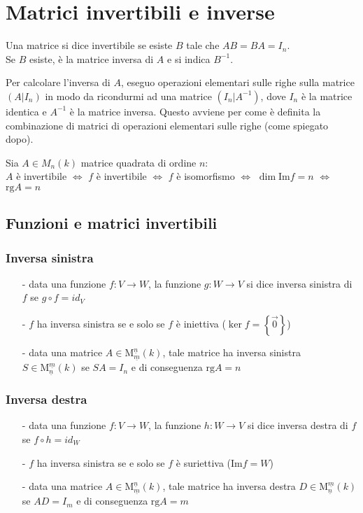 \documentclass[a4paper]{article}
\newcommand\m[2]{\text{M}_{\underline{#1}}^{\underline{#2}}}
\newcommand\img{\text{Im}}		%
\newcommand\rg{\text{rg}} 		%
\begin{document}
\newpage

\section{Matrici invertibili e inverse}
Una matrice si dice invertibile se esiste \(B\) tale che \(AB = BA = I_n\). \\
Se \(B\) esiste, è la matrice inversa di \(A\) e si indica \(B^{-1}\).

Per calcolare l'inversa di \(A\), eseguo operazioni elementari sulle righe sulla matrice \((A|I_n)\) in modo da ricondurmi ad una
matrice \((I_n|A^{-1})\), dove \(I_n\) è la matrice identica e \(A^{-1}\) è la matrice inversa. Questo avviene per come è definita
la combinazione di matrici di operazioni elementari sulle righe (come spiegato dopo).

Sia \(A \in M_n(k)\) matrice quadrata di ordine \(n\): \\
\(A\) è invertibile \(\Leftrightarrow\) \(f\) è invertibile \(\Leftrightarrow\) \(f\) è isomorfismo \(\Leftrightarrow\) \(\dim \img f = n\)
\(\Leftrightarrow\) \(\rg A = n\)

\subsection{Funzioni e matrici invertibili}
\subsubsection*{Inversa sinistra}
\begin{itemize}[topsep=3pt, itemsep=0pt]
	\item[-] data una funzione \(f: V \to W\), la funzione \(g: W \to V\) si dice inversa sinistra di \(f\) se \(g \circ f = id_V\)
	\item[-] \(f\) ha inversa sinistra se e solo se \(f\) è iniettiva (\(\ker f = \left\{\vec{0}\right\}\))
	\item[-] data una matrice \(A \in \m{m}{n}(k)\), tale matrice ha inversa sinistra \(S \in \m{n}{m}(k)\) se \(SA = I_n\) e di
	conseguenza \(\rg A = n\)
\end{itemize}

\subsubsection*{Inversa destra}
\begin{itemize}[topsep=3pt, itemsep=0pt]
	\item[-] data una funzione \(f: V \to W\), la funzione \(h: W \to V\) si dice inversa destra di \(f\) se \(f \circ h = id_W\)
	\item[-] \(f\) ha inversa sinistra se e solo se \(f\) è suriettiva (\(\img f = W\))
	\item[-] data una matrice \(A \in \m{m}{n}(k)\), tale matrice ha inversa destra \(D \in \m{n}{m}(k)\) se \(AD = I_m\) e di
	conseguenza \(\rg A = m\)
\end{itemize}
\end{document}
